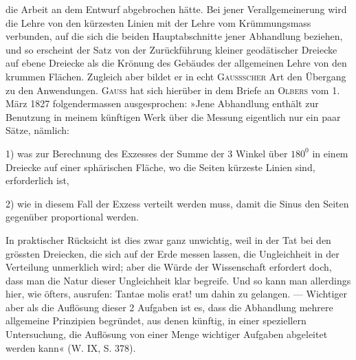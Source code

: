 die Arbeit an dem Entwurf abgebrochen hätte. Bei jener Verallgemeinerung
wird die Lehre von den kürzesten Linien mit der Lehre vom Krümmungsmass
verbunden, auf die sich die beiden Hauptabschnitte jener Abhandlung beziehen,
und so erscheint der Satz von der Zurückführung kleiner geodätischer Dreiecke
auf ebene Dreiecke als die Krönung des Gebäudes der allgemeinen Lehre
von den krummen Flächen. Zugleich aber bildet er in echt \textsc{Gaussscher} Art
den Übergang zu den Anwendungen. \textsc{Gauss} hat sich hierüber in dem Briefe
an \textsc{Olbers} vom 1. März 1827 folgendermassen ausgesprochen: »Jene Abhandlung
enthält zur  Benutzung in meinem künftigen Werk über
die Messung eigentlich nur ein paar Sätze, nämlich:
\par
1) was zur Berechnung des Exzesses der Summe der 3 Winkel über \(180^0\)
in einem Dreiecke auf einer  sphärischen Fläche, wo die Seiten kürzeste
Linien sind, erforderlich ist,
\par
2) wie in diesem Fall der Exzess  verteilt werden muss, damit
die Sinus den Seiten gegenüber proportional werden.
\par
In praktischer Rücksicht ist dies zwar ganz unwichtig, weil in der Tat
bei den grössten Dreiecken, die sich auf der Erde messen lassen, die Ungleichheit
in der Verteilung unmerklich wird; aber die Würde der Wissenschaft
erfordert doch, dass man die Natur dieser Ungleichheit klar begreife. Und
so kann man allerdings hier, wie öfters, ausrufen: Tantae molis erat! um
dahin zu gelangen. — Wichtiger aber als die Auflösung dieser 2 Aufgaben
ist es, dass die Abhandlung mehrere allgemeine Prinzipien begründet, aus
denen künftig, in einer speziellern Untersuchung, die Auflösung von einer
Menge wichtiger Aufgaben abgeleitet werden kann« (W. IX, S. 378).
\clearpage\endgroup
